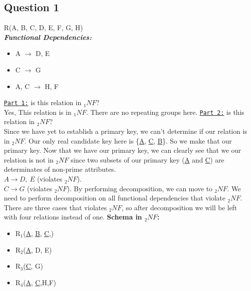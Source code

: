 \documentclass[letterpaper, 11pt]{article}
\newcommand{\1}{\mathds{1}}	%
\theoremstyle{definition}
\begin{document}
\begin{mdframed}
  
\subsection*{Question 1}
  
R(A, B, C, D, E, F, G, H) \\
\textit{\textbf{Functional Dependencies:}}
\begin{itemize}
    \item[\ding{228}] A $\rightarrow$ D, E
    \item[\ding{228}] C $\rightarrow$ G
    \item[\ding{228}] A, C $\rightarrow$ H, F
\end{itemize}
\end{mdframed}
\underline{\texttt{Part 1:}} is this relation in $_1NF$? \\
Yes, This relation is in $_1NF$. There are no repeating groups here.
\bigbreak \noindent
\underline{\texttt{Part 2:}} is this relation in $_2NF$? \\
Since we have yet to establish a primary key, we can't determine if our relation is in $_2NF$. Our only real candidate key here is \{\underline{A}, \underline{C}, \underline{B}\}. So we make that our primary key.
\bigbreak \noindent
Now that we have our primary key, we can clearly see that we our relation is not in $_2NF$ since two subsets of our primary key (\underline{A} and \underline{C}) are  determinates of non-prime attributes. \vspace{2mm} \\
$A \rightarrow D, \ E$ (violates $_2NF$). \\
$C  \rightarrow G$ (violates $_2NF$).
\bigbreak \noindent
By performing decomposition, we can move to $_2NF$. We need to perform decomposition on all functional dependencies that violate $_2NF$. There are three cases that violates $_2NF$, so after decomposition we will be left with four relations instead of one. 
\bigbreak \noindent
\textbf{Schema in $_2NF$:}
 \begin{itemize}
     \item[\ding{221}] R$_1$(\underline{A}, \underline{B}, \underline{C},)
     \item[\ding{221}] R$_2$(\underline{A}, D, E)
     \item[\ding{221}] R$_3$(\underline{C}, G)
     \item[\ding{221}] R$_4$(\underline{A}, \underline{C},H,F)

 \end{itemize}
\end{document}
